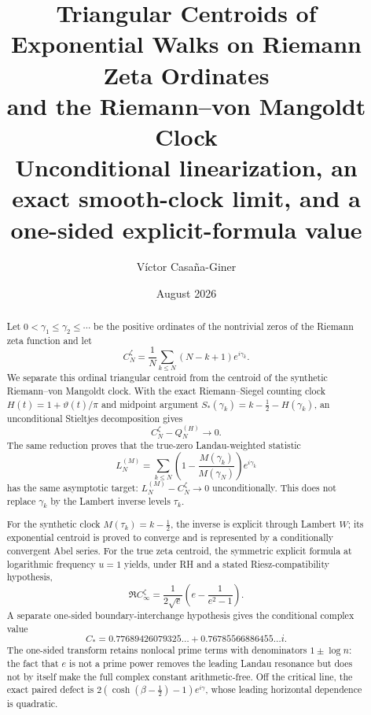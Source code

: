\documentclass[11pt]{amsart}
\title[Triangular centroids of zeta ordinates]{Triangular Centroids of Exponential Walks on Riemann Zeta Ordinates\\
and the Riemann--von Mangoldt Clock\\[0.4em]
\large Unconditional linearization, an exact smooth-clock limit, and a one-sided explicit-formula value}
\author{Víctor Casaña-Giner}
\date{August 2026}
\numberwithin{equation}{section}
\theoremstyle{definition}
\theoremstyle{remark}
\begin{document}
\begin{abstract}
Let $0<\gamma_1\leq\gamma_2\leq\cdots$ be the positive ordinates of the nontrivial zeros of the Riemann zeta function and let
\begin{equation}\label{eq:abstract_centroid}
C_N^{\zeta}=\frac1N\sum_{k\leq N}(N-k+1)e^{i\gamma_k}.
\end{equation}
We separate this ordinal triangular centroid from the centroid of the synthetic Riemann--von Mangoldt clock.  With the exact Riemann--Siegel counting clock $H(t)=1+\vartheta(t)/\pi$ and midpoint argument $S_*(\gamma_k)=k-\tfrac12-H(\gamma_k)$, an unconditional Stieltjes decomposition gives
\begin{equation}\label{eq:abstract_level1_short}
C_N^{\zeta}-Q_N^{(H)}\longrightarrow0.
\end{equation}
The same reduction proves that the true-zero Landau-weighted statistic
\begin{equation}\label{eq:abstract_true_zero_landau}
L_N^{(M)}=\sum_{k\leq N}\left(1-\frac{M(\gamma_k)}{M(\gamma_N)}\right)e^{i\gamma_k}
\end{equation}
has the same asymptotic target: $L_N^{(M)}-C_N^{\zeta}\to0$ unconditionally.  This does not replace $\gamma_k$ by the Lambert inverse levels $\tau_k$.

For the synthetic clock $M(\tau_k)=k-\tfrac12$, the inverse is explicit through Lambert $W$; its exponential centroid is proved to converge and is represented by a conditionally convergent Abel series.  For the true zeta centroid, the symmetric explicit formula at logarithmic frequency $u=1$ yields, under RH and a stated Riesz-compatibility hypothesis,
\begin{equation}\label{eq:abstract_real_constant_short}
\Re C_\infty^{\zeta}
=\frac{1}{2\sqrt e}\left(e-\frac1{e^2-1}\right).
\end{equation}
A separate one-sided boundary-interchange hypothesis gives the conditional complex value
\begin{equation}\label{eq:abstract_complex_constant_short}
C_* =0.77689426079325\ldots+0.76785566886455\ldots i.
\end{equation}
The one-sided transform retains nonlocal prime terms with denominators $1\pm\log n$: the fact that $e$ is not a prime power removes the leading Landau resonance but does not by itself make the full complex constant arithmetic-free.  Off the critical line, the exact paired defect is $2(\cosh(\beta-\tfrac12)-1)e^{i\gamma}$, whose leading horizontal dependence is quadratic.
\end{abstract}
\end{document}
